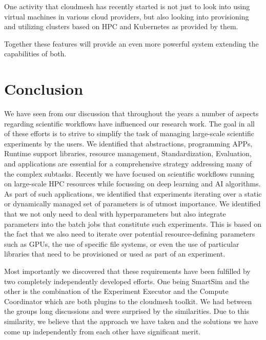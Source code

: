 \documentclass[utf8]{FrontiersinVancouver} %
\begin{document}
One activity that cloudmesh has recently started is not just to look into using virtual machines in various cloud providers, but also looking into provisioning and utilizing clusters based on HPC and Kubernetes as provided by them. 

Together these features will provide an even more powerful system extending the capabilities of both. 




\section{Conclusion}

We have seen from our discussion that throughout the years a number of aspects regarding scientific workflows have influenced our research work. The goal in all of these efforts is to strive to simplify the task of managing large-scale scientific experiments by the users. We identified that abstractions, programming APPs, Runtime support libraries, resource management, Standardization, Evaluation, and applications are essential for a comprehensive strategy addressing many of the complex subtasks.
Recently we have focused on scientific workflows running on large-scale HPC resources while focussing on deep learning and AI algorithms. As part of such applications, we identified that experiments iterating over a static or dynamically managed set of parameters is of utmost importance. We identified that we not only need to deal with hyperparameters but also integrate parameters into the batch jobs that constitute such experiments. This is based on the fact that we also need to iterate over potential resource-defining parameters such as GPUs, the use of specific file systems, or even the use of particular libraries that need to be provisioned or used as part of an experiment.

Most importantly we discovered that these requirements have been fulfilled by two completely independently developed efforts. One being SmartSim and the other is the combination of the Experiment Executor and the Compute Coordinator which are both plugins to the cloudmesh toolkit. We had between the groups long discussions and were surprised by the similarities. Due to this similarity, we believe that the approach we have taken and the solutions we have come up independently from each other have significant merit. 
\end{document}

